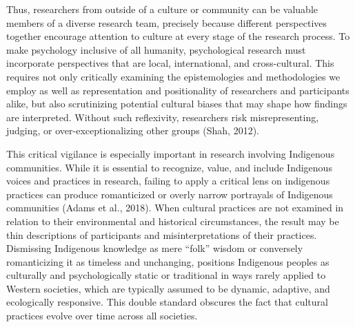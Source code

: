 \documentclass[
  11pt,
]{book}
\begin{document}
Thus, researchers from outside of a culture or community can be valuable members of a diverse research team, precisely because different perspectives together encourage attention to culture at every stage of the research process. To make psychology inclusive of all humanity, psychological research must incorporate perspectives that are local, international, and cross-cultural. This requires not only critically examining the epistemologies and methodologies we employ as well as representation and positionality of researchers and participants alike, but also scrutinizing potential cultural biases that may shape how findings are interpreted. Without such reflexivity, researchers risk misrepresenting, judging, or over-exceptionalizing other groups (Shah, 2012).

This critical vigilance is especially important in research involving Indigenous communities. While it is essential to recognize, value, and include Indigenous voices and practices in research, failing to apply a critical lens on indigenous practices can produce romanticized or overly narrow portrayals of Indigenous communities (Adams et al., 2018). When cultural practices are not examined in relation to their environmental and historical circumstances, the result may be thin descriptions of participants and misinterpretations of their practices. Dismissing Indigenous knowledge as mere ``folk'' wisdom or conversely romanticizing it as timeless and unchanging, positions Indigenous peoples as culturally and psychologically static or traditional in ways rarely applied to Western societies, which are typically assumed to be dynamic, adaptive, and ecologically responsive. This double standard obscures the fact that cultural practices evolve over time across all societies.
\end{document}
